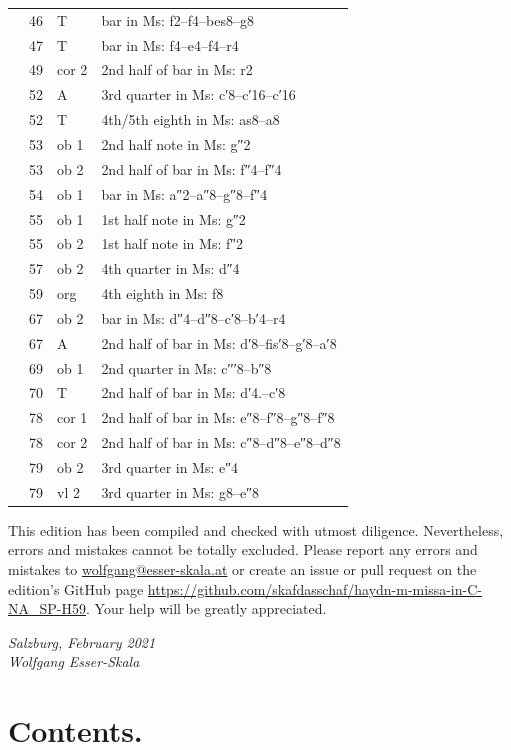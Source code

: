 \documentclass[parskip=full]{scrreprt}
\newif\iftemplate\templatetrue
\begin{document}
\begin{longtable}{lll L{10cm}}
	  & 46   & T       & bar in Ms: f2–f4–bes8–g8 \\
	  & 47   & T       & bar in Ms: f4–e4–f4–r4 \\
	  & 49   & cor 2   & 2nd half of bar in Ms: r2 \\
	  & 52   & A       & 3rd quarter in Ms: c′8–c′16–c′16 \\
	  & 52   & T       & 4th/5th eighth in Ms: as8–a8 \\
	  & 53   & ob 1    & 2nd half note in Ms: g″2 \\
	  & 53   & ob 2    & 2nd half of bar in Ms: f″4–f″4 \\
	  & 54   & ob 1    & bar in Ms: a″2–a″8–g″8–f″4 \\
	  & 55   & ob 1    & 1st half note in Ms: g″2 \\
	  & 55   & ob 2    & 1st half note in Ms: f″2 \\
		& 57   & ob 2    & 4th quarter in Ms: d″4 \\
	  & 59   & org     & 4th eighth in Ms: f8 \\
	  & 67   & ob 2    & bar in Ms: d″4–d″8–c′8–b′4–r4 \\
	  & 67   & A       & 2nd half of bar in Ms: d′8–fis′8–g′8–a′8 \\
	  & 69   & ob 1    & 2nd quarter in Ms: c′′′8–b″8 \\
	  & 70   & T       & 2nd half of bar in Ms: d′4.–c′8 \\
	  & 78   & cor 1   & 2nd half of bar in Ms: e″8–f″8–g″8–f″8 \\
	  & 78   & cor 2   & 2nd half of bar in Ms: c″8–d″8–e″8–d″8 \\
	  & 79   & ob 2    & 3rd quarter in Ms: e″4 \\
	  & 79   & vl 2    & 3rd quarter in Ms: g8–e″8 \\
	\bottomrule
\end{longtable}


This edition has been compiled and checked with utmost diligence. Nevertheless, errors and mistakes cannot be totally excluded. Please report any errors and mistakes to \url{wolfgang@esser-skala.at} or create an issue or pull request on the edition’s GitHub page \url{https://github.com/skafdasschaf/haydn-m-missa-in-C-NA_SP-H59}. Your help will be greatly appreciated.

\bigskip
\textit{Salzburg, February 2021\\
Wolfgang Esser-Skala}

\cleardoublepage
\chapter*{Contents.}




\cleardoublepage
\fi

\iftemplate

\fi
\end{document}

